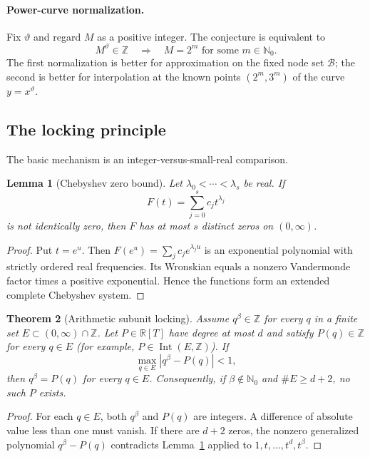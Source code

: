 \documentclass[11pt,oneside]{article}
\newtheorem{theorem}{Theorem}[section]
\newtheorem{lemma}[theorem]{Lemma}
\theoremstyle{definition}
\theoremstyle{remark}
\newcommand{\Nzero}{\mathbb N_0}
\newcommand{\Z}{\mathbb Z}
\newcommand{\R}{\mathbb R}
\newcommand{\Bsem}{\mathcal B}
\newcommand{\thetaq}{\vartheta}
\begin{document}
\paragraph{Power-curve normalization.}
Fix $\thetaq$ and regard $M$ as a positive integer.  The conjecture is equivalent to
\[
  M^{\thetaq}\in\Z\quad\Longrightarrow\quad M=2^m\text{ for some }m\in\Nzero.
\]
The first normalization is better for approximation on the fixed node set $\Bsem$; the
second is better for interpolation at the known points
$(2^m,3^m)$ of the curve $y=x^{\thetaq}$.

\subsection{The locking principle}

The basic mechanism is an integer-versus-small-real comparison.

\begin{lemma}[Chebyshev zero bound]
\label{lem:power-cheb}
Let $\lambda_0<\cdots<\lambda_s$ be real.  If
\[
  F(t)=\sum_{j=0}^s c_jt^{\lambda_j}
\]
is not identically zero, then $F$ has at most $s$ distinct zeros on $(0,\infty)$.
\end{lemma}

\begin{proof}
Put $t=e^u$.  Then $F(e^u)=\sum_jc_je^{\lambda_ju}$ is an exponential polynomial with
strictly ordered real frequencies.  Its Wronskian equals a nonzero Vandermonde factor times a
positive exponential.  Hence the functions form an extended complete Chebyshev system.
\end{proof}

\begin{theorem}[Arithmetic subunit locking]
\label{thm:locking}
Assume $q^\beta\in\Z$ for every $q$ in a finite set $E\subset(0,\infty)\cap\Z$.  Let
$P\in\R[T]$ have degree at most $d$ and satisfy $P(q)\in\Z$ for every $q\in E$
(for example, $P\in\operatorname{Int}(E,\Z)$).  If
\[
  \max_{q\in E}|q^\beta-P(q)|<1,
\]
then $q^\beta=P(q)$ for every $q\in E$.  Consequently, if $\beta\notin\Nzero$ and
$\#E\ge d+2$, no such $P$ exists.
\end{theorem}

\begin{proof}
For each $q\in E$, both $q^\beta$ and $P(q)$ are integers.  A difference of absolute value
less than one must vanish.  If there are $d+2$ zeros, the nonzero generalized polynomial
$q^\beta-P(q)$ contradicts Lemma~\ref{lem:power-cheb} applied to
$1,t,\ldots,t^d,t^\beta$.
\end{proof}
\end{document}
